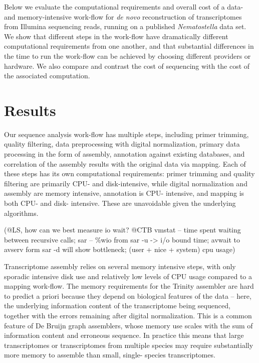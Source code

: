Below we evaluate the computational requirements and overall cost of a
data- and memory-intensive work-flow for {\em de novo} reconstruction
of transcriptomes from Illumina sequencing reads, running on a
published {\em Nematostella} data set.  We show that different steps
in the work-flow have dramatically different computational
requirements from one another, and that substantial differences in the
time to run the work-flow can be achieved by choosing different
providers or hardware. We also compare and contrast the cost of
sequencing with the cost of the associated computation.

\section*{Results}

Our sequence analysis work-flow has multiple steps, including primer
trimming, quality filtering, data preprocessing with digital
normalization, primary data processing in the form of assembly,
annotation against existing databases, and correlation of the assembly
results with the original data via mapping.  Each of these steps has
its own computational requirements: primer trimming and quality
filtering are primarily CPU- and disk-intensive, while digital
normalization and assembly are memory intensive, annotation is CPU-
intensive, and mapping is both CPU- and disk- intensive.  These are
unavoidable given the underlying algorithms.

(@LS, how can we best measure io wait? @CTB vmstat -- time spent
waiting between recursive calls;  sar --  \%wio from sar -u -> i/o
bound time;   avwait to avserv form sar -d will show bottleneck;
(user + nice + system) cpu usage)

Transcriptome assembly relies on several memory intensive steps, with
only sporadic intensive disk use and relatively low levels of CPU
usage compared to a mapping work-flow. The memory requirements for the
Trinity assembler are hard to predict a priori because they depend on
biological features of the data -- here, the underlying information
content of the transcriptome being sequenced, together with the errors
remaining after digital normalization.  This is a common feature of De
Bruijn graph assemblers, whose memory use scales with the sum of
information content and erroneous sequence.  In practice this means
that large transcriptomes or transcriptomes from multiple species may
require substantially more memory to assemble than small, single-
species transcriptomes.

